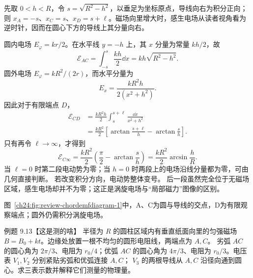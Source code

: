 \begin{xesolution}
先取 $0<h<R$，令 $s=\sqrt{R^2-h^2}$，以垂足为坐标原点，导线向右为积分正向；则 $x_A=-s$、$x_C=s$、$x_D=s+\ell$。磁场向里增大时，感生电场从读者视角看为逆时针，因而在圆心下方的导线上其分量向右。

圆内电场 $E_\varphi=kr/2$。在水平线 $y=-h$ 上，其 $x$ 分量为常量 $kh/2$，故
\begin{equation}
  \boxed{\mathcal E_{AC}=\int_{-s}^{s}\frac{kh}{2}\dd x
  =kh\sqrt{R^2-h^2}}.
\end{equation}
圆外电场 $E_\varphi=kR^2/(2r)$，而水平分量为
\begin{equation}
  E_x=\frac{kR^2h}{2(x^2+h^2)}.
\end{equation}
因此对于有限端点 $D$，
\begin{align}
  \mathcal E_{CD}
  &=\frac{kR^2h}{2}\int_s^{s+\ell}\frac{\dd x}{x^2+h^2}\\
  &=\boxed{\frac{kR^2}{2}\left[\arctan\frac{s+\ell}{h}-\arctan\frac{s}{h}\right]}.
\end{align}
只有再令 $\ell\to\infty$，才得到
\[
 \boxed{\mathcal E_{C\infty}=\frac{kR^2}{2}\left(\frac\pi2-\arctan\frac{s}{h}\right)
 =\frac{kR^2}{2}\arcsin\frac hR}.
\]
当 $\ell=0$ 时第二段电动势为零；当 $h=0$ 时两段上的电场沿线分量都为零，可由几何直接判断。
若改变积分方向，电动势整体变号。
后一段虽然完全位于无磁场区域，感生电场却并不为零；这正是涡旋电场与“局部磁力”图像的区别。

图~\ref{ch24:fig:review-chordemfdiagram-1}中，A、C为圆与导线的交点，D为有限观察端点；圆外仍需积分涡旋电场。
\par\noindent\begin{minipage}{\linewidth}
\chordEmfDiagram
{}\label{ch24:fig:review-chordemfdiagram-1}
\end{minipage}\par\medskip
\end{xesolution}

\begin{origexamplebox}{例题 9.13【这是测的啥】}
半径为 $R$ 的圆柱区域内有垂直纸面向里的匀强磁场 $B=B_0+kt$。边缘处放置一根不均匀的圆形电阻线，两端点为 $A,C$。
劣弧 $AC$ 的圆心角为 $2\pi/3$、电阻为 $r_0/4$；优弧 $AC$ 的圆心角为 $4\pi/3$、电阻为 $r_0/3$。电压表 $V_1,V_2$ 分别紧贴劣弧和优弧连接 $A,C$；
$V_3$ 的两根导线从 $A,C$ 沿径向通到圆心。求三表示数并解释它们测量的物理量。
\par\noindent\begin{minipage}{\linewidth}
\circularVoltmetersDiagram
{}\label{ch24:fig:review-circularvoltmetersdiagram-1}
\end{minipage}\par\medskip
\end{origexamplebox}

